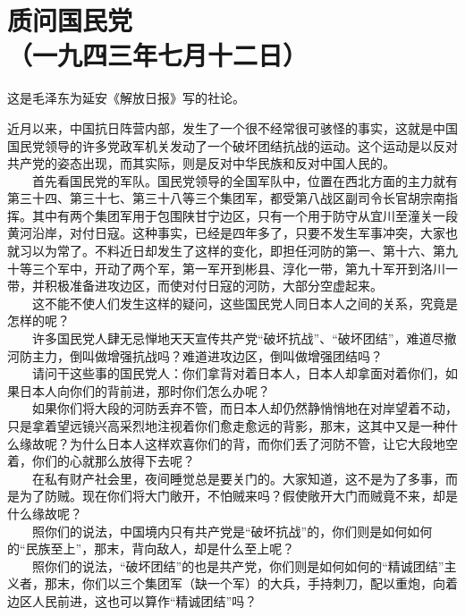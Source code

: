 \documentclass[cn,11pt,chinese]{elegantbook}
\def\myformat#1{\hfil\hfil #1}
\begin{document}
\newpage\section*{\myformat{质问国民党}\\\myformat{（一九四三年七月十二日）}}
\begin{introduction}\item  这是毛泽东为延安《解放日报》写的社论。\end{introduction}
近月以来，中国抗日阵营内部，发生了一个很不经常很可骇怪的事实，这就是中国国民党领导的许多党政军机关发动了一个破坏团结抗战的运动。这个运动是以反对共产党的姿态出现，而其实际，则是反对中华民族和反对中国人民的。\\
　　首先看国民党的军队。国民党领导的全国军队中，位置在西北方面的主力就有第三十四、第三十七、第三十八等三个集团军，都受第八战区副司令长官胡宗南指挥。其中有两个集团军用于包围陕甘宁边区，只有一个用于防守从宜川至潼关一段黄河沿岸，对付日寇。这种事实，已经是四年多了，只要不发生军事冲突，大家也就习以为常了。不料近日却发生了这样的变化，即担任河防的第一、第十六、第九十等三个军中，开动了两个军，第一军开到彬县、淳化一带，第九十军开到洛川一带，并积极准备进攻边区，而使对付日寇的河防，大部分空虚起来。\\
　　这不能不使人们发生这样的疑问，这些国民党人同日本人之间的关系，究竟是怎样的呢？\\
　　许多国民党人肆无忌惮地天天宣传共产党“破坏抗战”、“破坏团结”，难道尽撤河防主力，倒叫做增强抗战吗？难道进攻边区，倒叫做增强团结吗？\\
　　请问干这些事的国民党人：你们拿背对着日本人，日本人却拿面对着你们，如果日本人向你们的背前进，那时你们怎么办呢？\\
　　如果你们将大段的河防丢弃不管，而日本人却仍然静悄悄地在对岸望着不动，只是拿着望远镜兴高采烈地注视着你们愈走愈远的背影，那末，这其中又是一种什么缘故呢？为什么日本人这样欢喜你们的背，而你们丢了河防不管，让它大段地空着，你们的心就那么放得下去呢？\\
　　在私有财产社会里，夜间睡觉总是要关门的。大家知道，这不是为了多事，而是为了防贼。现在你们将大门敞开，不怕贼来吗？假使敞开大门而贼竟不来，却是什么缘故呢？\\
　　照你们的说法，中国境内只有共产党是“破坏抗战”的，你们则是如何如何的“民族至上”，那末，背向敌人，却是什么至上呢？\\
　　照你们的说法，“破坏团结”的也是共产党，你们则是如何如何的“精诚团结”主义者，那末，你们以三个集团军（缺一个军）的大兵，手持刺刀，配以重炮，向着边区人民前进，这也可以算作“精诚团结”吗？\\
\end{document}
